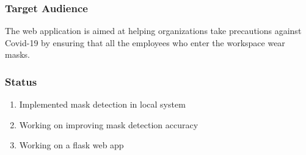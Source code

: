 \documentclass[14pt]{beamer}
\newcounter{saveenumerate}
\newcommand{\restartenumerate}{\setcounter{enumi}{\value{saveenumerate}}}
\begin{document}
\begin{frame}
    \frametitle{Target Audience}
    The web application is  aimed at helping organizations take precautions against Covid-19 by ensuring that all the employees who enter the workspace wear masks.
\end{frame}

\begin{frame}
    \frametitle{Status}
    \begin{enumerate}
        \restartenumerate
        \item Implemented mask detection in local system
        \item Working on improving mask detection accuracy
        \item Working on a flask web app
    \end{enumerate}
\end{frame}
\end{document}

